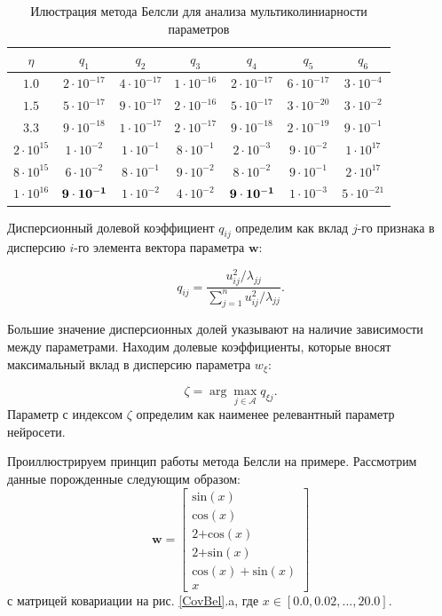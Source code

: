 \begin{table}[h]
\begin{center}
\caption{Илюстрация метода Белсли для анализа мультиколиниарности параметров}
\begin{tabular}{|c|cccccc|}
\hline
$\eta$ & $q_1$& $q_2$& $q_3$& $q_4$& $q_5$& $q_6$\\
\hline
$1.0$ &  $2\cdot 10^{-17}$ &  $4\cdot 10^{-17}$ &  $1\cdot 10^{-16}$ &  $2\cdot 10^{-17}$ &  $6\cdot 10^{-17}$&  $3\cdot 10^{-4}$ \\
\hline
$1.5$ &  $5\cdot 10^{-17}$ &  $9\cdot 10^{-17}$ &  $2\cdot 10^{-16}$ &  $5\cdot 10^{-17}$ &  $3\cdot 10^{-20}$ &  $3\cdot 10^{-2}$ \\
\hline
$3.3$ &  $9\cdot 10^{-18}$ &  $1\cdot 10^{-17}$ &  $2\cdot 10^{-17}$ &  $9\cdot 10^{-18}$ &  $2\cdot 10^{-19}$ &  $9\cdot 10^{-1}$ \\
\hline
$2\cdot 10^{15}$ &  $1\cdot 10^{-2}$ &  $1\cdot 10^{-1}$ &  $8\cdot 10^{-1}$ &  $2\cdot 10^{-3}$ &  $9\cdot 10^{-2}$ &  $1\cdot 10^{17}$ \\ 
\hline
$8\cdot 10^{15}$ &  $6\cdot 10^{-2}$ &  $8\cdot 10^{-1}$ &  $9\cdot 10^{-2}$ &  $8\cdot 10^{-2}$ &  $9\cdot 10^{-1}$ & $ 2\cdot 10^{17} $\\
\hline
$1\cdot 10^{16}$ &  $\bf9\cdot 10^{-1}$ &  $1\cdot 10^{-2}$& $ 4\cdot 10^{-2}$&  $\bf9\cdot 10^{-1}$ &  $1\cdot 10^{-3}$ & $ 5\cdot 10^{-21}$ \\
\hline
\end{tabular}
\label{CovBelTable}
\end{center}
\end{table}

Дисперсионный долевой коэффициент $q_{ij}$ определим как вклад $j$-го признака в дисперсию $i$-го элемента вектора параметра $\textbf{w}$:

\[
\label{4.3}
q_{ij} = \frac{u^2_{ij}/\lambda_{jj}}{\sum^n_{j=1}{u^2_{ij}/\lambda_{jj}}}.
\]

Большие значение дисперсионных долей указывают на наличие зависимости между параметрами. Находим долевые коэффициенты, которые вносят максимальный вклад в дисперсию параметра $w_\xi$:

\[
\label{4.4}
\zeta = \arg\max_{j\in \mathcal{A}}{q_{\xi j}}.
\]
Параметр с индексом $\zeta$ определим как наименее релевантный параметр нейросети. 

Проиллюстрируем принцип работы метода Белсли на примере. Рассмотрим данные порожденные следующим образом: 
\[
\textbf{w} = \begin{bmatrix}
\text{sin}(x)\\
\text{cos}(x)\\
\text{2+cos}(x)\\
\text{2+sin}(x)\\
\text{cos}(x) + \text{sin}(x)\\
x
\end{bmatrix}
\]
с матрицей ковариации на рис. \ref{CovBel}.a, где $x \in [0.0, 0.02, ..., 20.0]$.


